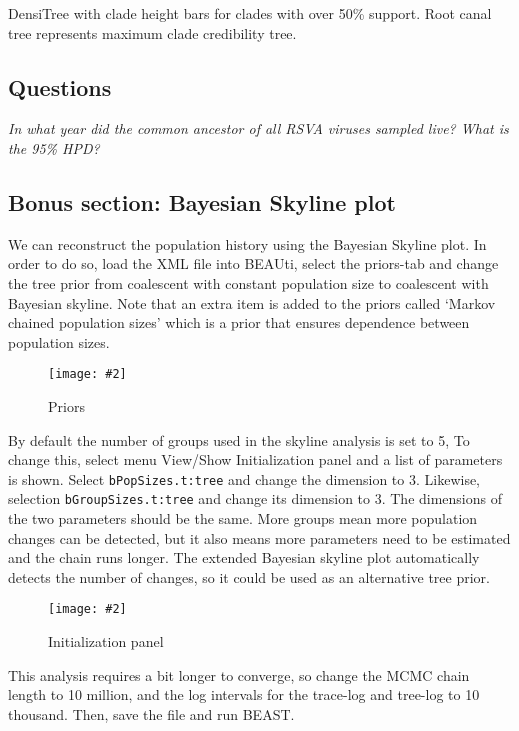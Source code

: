 \documentclass[12pt]{article}
\newcommand{\includeimage}[2][]{%
\texttt{[image: \#2]}
}
\begin{document}
DensiTree with clade height bars for clades with over 50\% support.
Root canal tree represents maximum clade credibility tree.


\subsection*{Questions}

\textit{In what year did the common ancestor of all RSVA viruses sampled live? What is the
95\% HPD?}



\subsection*{Bonus section: Bayesian Skyline plot}

We can reconstruct the population history using the Bayesian Skyline plot. In order to do so,
load the XML file into BEAUti, select the priors-tab and change the tree prior from 
coalescent with constant population size to coalescent with Bayesian skyline.
Note that an extra item is added to the priors called `Markov chained population sizes'
which is a prior that ensures dependence between population sizes.

\begin{figure}
\centering	
\includeimage[width=0.8\textwidth]{figures/BEAUti_priors2}
\label{fig:BEAUti_priors2}
\caption{Priors}
\end{figure}

By default the number of groups used in the skyline analysis is set to 5, To change this,
select menu View/Show Initialization panel and a list of parameters is shown. Select
{\tt bPopSizes.t:tree} and change the dimension to 3. Likewise, selection {\tt bGroupSizes.t:tree}
and change its dimension to 3. The dimensions of the two parameters should be the same.
More groups mean more population changes can be detected, but it also means more parameters
need to be estimated and the chain runs longer. The extended Bayesian skyline plot
automatically detects the number of changes, so it could be used as an alternative
tree prior.

\begin{figure}
\centering	
\includeimage[width=0.8\textwidth]{figures/BEAUti_init}
\label{fig:BEAUti_init}
\caption{Initialization panel}
\end{figure}


This analysis requires a bit longer to converge, so change the MCMC chain length to 10 million,
and the log intervals for the trace-log and tree-log to 10 thousand. 
Then, save the file and run BEAST.
\end{document}
